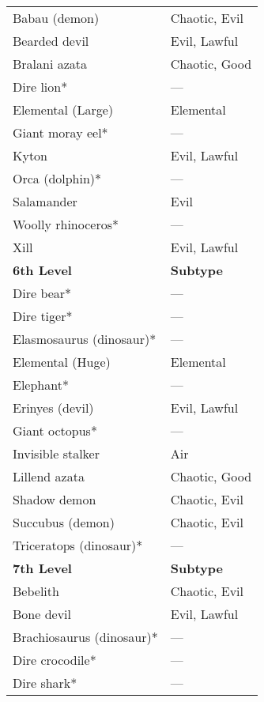 \begin{xtabular}{ll}
Babau (demon)             & Chaotic, Evil    \\
Bearded devil             & Evil, Lawful     \\
Bralani azata             & Chaotic, Good    \\
Dire lion*                & ---                \\
Elemental (Large)         & Elemental        \\
Giant moray eel*          & ---                \\
Kyton                     & Evil, Lawful     \\
Orca (dolphin)*           & ---                \\
Salamander                & Evil             \\
Woolly rhinoceros*        & ---                \\
Xill                      & Evil, Lawful     \\
\textbf{6th Level}        & \textbf{Subtype} \\
Dire bear*                & ---                \\
Dire tiger*               & ---                \\
Elasmosaurus (dinosaur)*  & ---                \\
Elemental (Huge)          & Elemental        \\
Elephant*                 & ---                \\
Erinyes (devil)           & Evil, Lawful     \\
Giant octopus*            & ---                \\
Invisible stalker         & Air              \\
Lillend azata             & Chaotic, Good    \\
Shadow demon              & Chaotic, Evil    \\
Succubus (demon)          & Chaotic, Evil    \\
Triceratops (dinosaur)*   & ---                \\
\textbf{7th Level}        & \textbf{Subtype} \\
Bebelith                  & Chaotic, Evil    \\
Bone devil                & Evil, Lawful     \\
Brachiosaurus (dinosaur)* & ---                \\
Dire crocodile*           & ---                \\
Dire shark*               & ---                \\

\end{xtabular}
